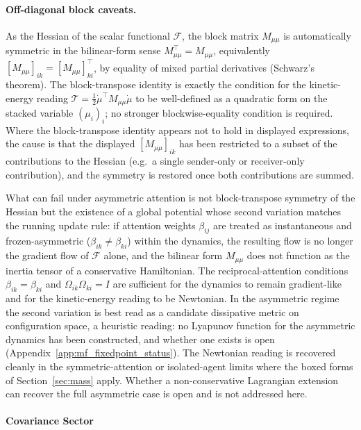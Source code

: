 \documentclass[11pt]{article}
\begin{document}
\paragraph{Off-diagonal block caveats.}\label{sec:mass_block_caveats}
As the Hessian of the scalar functional $\mathcal{F}$, the block matrix $M_{\mu\mu}$ is automatically symmetric in the bilinear-form sense $M_{\mu\mu}^\top = M_{\mu\mu}$, equivalently $[M_{\mu\mu}]_{ik} = [M_{\mu\mu}]_{ki}^\top$, by equality of mixed partial derivatives (Schwarz's theorem). The block-transpose identity is exactly the condition for the kinetic-energy reading $\mathcal{T} = \tfrac12 \dot\mu^\top M_{\mu\mu} \dot\mu$ to be well-defined as a quadratic form on the stacked variable $(\mu_i)_i$; no stronger blockwise-equality condition is required. Where the block-transpose identity appears not to hold in displayed expressions, the cause is that the displayed $[M_{\mu\mu}]_{ik}$ has been restricted to a subset of the contributions to the Hessian (e.g.\ a single sender-only or receiver-only contribution), and the symmetry is restored once both contributions are summed.

What can fail under asymmetric attention is not block-transpose symmetry of the Hessian but the existence of a global potential whose second variation matches the running update rule: if attention weights $\beta_{ij}$ are treated as instantaneous and frozen-asymmetric ($\beta_{ik}\neq\beta_{ki}$) within the dynamics, the resulting flow is no longer the gradient flow of $\mathcal{F}$ alone, and the bilinear form $M_{\mu\mu}$ does not function as the inertia tensor of a conservative Hamiltonian. The reciprocal-attention conditions $\beta_{ik} = \beta_{ki}$ and $\Omega_{ik}\Omega_{ki} = I$ are sufficient for the dynamics to remain gradient-like and for the kinetic-energy reading to be Newtonian. In the asymmetric regime the second variation is best read as a candidate dissipative metric on configuration space, a heuristic reading: no Lyapunov function for the asymmetric dynamics has been constructed, and whether one exists is open (Appendix~\ref{app:mf_fixedpoint_status}). The Newtonian reading is recovered cleanly in the symmetric-attention or isolated-agent limits where the boxed forms of Section~\ref{sec:mass} apply. Whether a non-conservative Lagrangian extension can recover the full asymmetric case is open and is not addressed here.

\paragraph{Covariance Sector}
\end{document}
